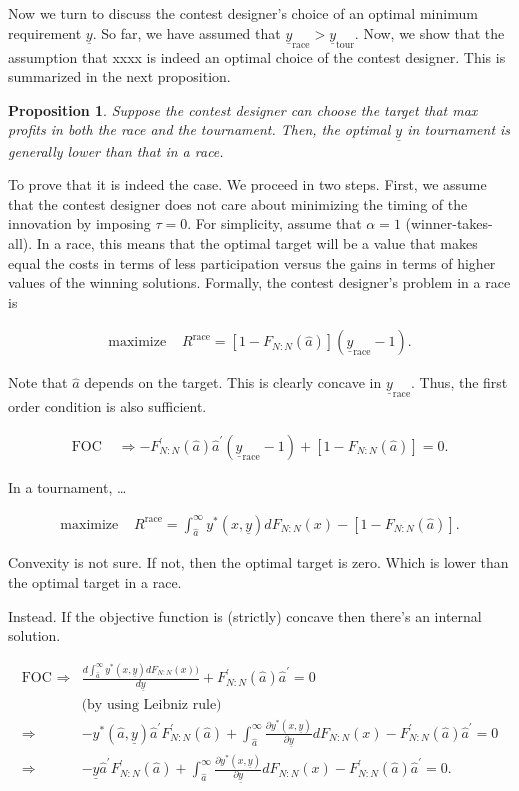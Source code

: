 \documentclass[10pt, titlepage]{article}
\newtheorem{proposition}{Proposition}
\newcommand\target{\underline{y}}
\newcommand\race{\text{race}}
\newcommand\tournament{\text{tour}}
\newcommand\mtype{\hat{a}}
\newcommand\dystar{\frac{\partial y^*(x,\target)}{\partial\target}dF_{N:N}(x)}
\begin{document}
Now we turn to discuss the contest designer's choice of an optimal
minimum requirement \(\target\). So far, we have assumed that
\(\target_\race>\target_\tournament\). Now, we show that the assumption
that xxxx is indeed an optimal choice of the contest designer. This is
summarized in the next proposition.

\begin{proposition}
Suppose the contest designer can choose the target that max profits in both the race and the tournament. Then, the optimal $\target$ in tournament is generally lower than that in a race.
\end{proposition}

To prove that it is indeed the case. We proceed in two steps. First, we
assume that the contest designer does not care about minimizing the
timing of the innovation by imposing \(\tau = 0\). For simplicity,
assume that \(\alpha=1\) (winner-takes-all). In a race, this means that
the optimal target will be a value that makes equal the costs in terms
of less participation versus the gains in terms of higher values of the
winning solutions. Formally, the contest designer's problem in a race is

\begin{align}
  \text{maximize } & R^\race = [1-F_{N:N}(\mtype)] (\target_\race - 1).
\end{align}

Note that \(\mtype\) depends on the target. This is clearly concave in
\(\target_\race\). Thus, the first order condition is also sufficient.

\begin{align}\label{foc race}
  \text{FOC } & \Rightarrow -F^\prime_{N:N}(\mtype) \mtype^\prime (\target_\race - 1) + [1-F_{N:N}(\mtype)] = 0.
\end{align}

In a tournament, \ldots{}

\begin{align}
  \text{maximize } & R^\race = \int_{\mtype}^\infty y^*(x, \target) d F_{N:N}(x) - [1-F_{N:N}(\mtype)]. 
\end{align}

Convexity is not sure. If not, then the optimal target is zero. Which is
lower than the optimal target in a race.

Instead. If the objective function is (strictly) concave then there's an
internal solution.

\begin{align} \label{foc tournament}
  \text{FOC } \Rightarrow & 
    \frac{d\int_{\mtype}^\infty y^*(x, \target) d F_{N:N}(x)) }{d \target}
      + F^\prime_{N:N}(\mtype) \mtype^\prime =0 \nonumber\\ 
    & \text{(by using Leibniz rule)}\nonumber\\
  \Rightarrow & - y^*(\mtype, \target) \mtype^\prime F^\prime_{N:N}(\mtype) 
      + \int_{\mtype}^\infty \dystar - F^\prime_{N:N}(\mtype) \mtype^\prime = 0\nonumber\\
  \Rightarrow & -\target \mtype^\prime F^\prime_{N:N}(\mtype) 
      + \int_{\mtype}^\infty \dystar - F^\prime_{N:N}(\mtype) \mtype^\prime = 0.
\end{align}
\end{document}
